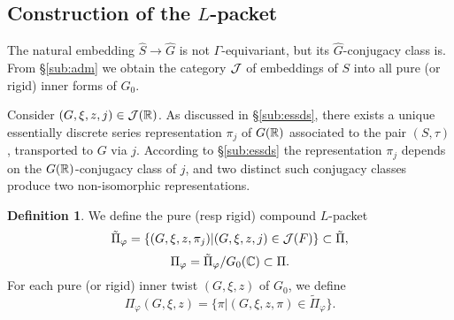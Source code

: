 \documentclass{article}
\theoremstyle{definition}
\newtheorem{dfn}[thm]{Definition}
\numberwithin{equation}{section}
\renewcommand{\-}{\hyp{}}
\newcommand{\warn}[1]{{\leavevmode\color{red}[#1]}}
\begin{document}
\subsection{Construction of the $L$\-packet}


The natural embedding $\hat S \to \hat G$ is not $\Gamma$-equivariant, but its $\hat G$-conjugacy class is. From \S\ref{sub:adm} we obtain the category $\mathcal{J}$ of embeddings of $S$ into all pure (or rigid) inner forms of $G_0$.

Consider $(G,\xi,z,j) \in \mathcal{J}(\mathbb{R})$. As discussed in \S\ref{sub:essds}, there exists a unique essentially discrete series representation $\pi_j$ of $G(\mathbb{R})$ associated to the pair $(S,\tau)$, transported to $G$ via $j$. According to \S\ref{sub:essds} the representation $\pi_j$ depends on the $G(\mathbb{R})$-conjugacy class of $j$, and two distinct such conjugacy classes produce two non-isomorphic representations.




\begin{dfn}
We define the pure (resp rigid) compound $L$\-packet
\[ \tilde\Pi_\varphi = \{(G,\xi,z,\pi_j)|(G,\xi,z,j) \in \mathcal{J}(F)\} \subset \tilde\Pi, \]
\[ \Pi_\varphi=\tilde\Pi_\varphi/G_0(\mathbb{C}) \subset \Pi. \]
For each pure (or rigid) inner twist $(G,\xi,z)$ of $G_0$, we define
\[ \Pi_\varphi(G,\xi,z)=\{\pi | (G,\xi,z,\pi) \in \tilde\Pi_\varphi\}. \]
\end{dfn}
\end{document}
